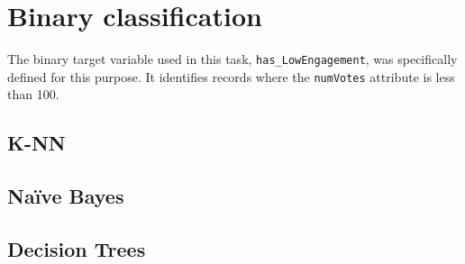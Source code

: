 \section{Binary classification}\label{sec:binary_classification}
The binary target variable used in this task, \texttt{has\_LowEngagement}, was specifically defined for this purpose. 
It identifies records where the \texttt{numVotes} attribute is less than 100.
\subsection{K-NN}
\subsection{Naïve Bayes}
\subsection{Decision Trees}